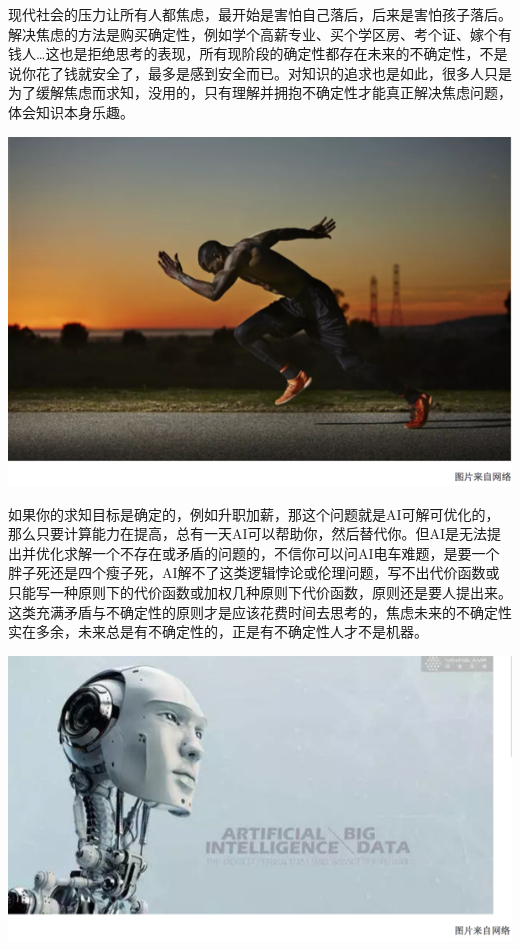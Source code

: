 \documentclass[]{book}
\begin{document}
现代社会的压力让所有人都焦虑，最开始是害怕自己落后，后来是害怕孩子落后。解决焦虑的方法是购买确定性，例如学个高薪专业、买个学区房、考个证、嫁个有钱人\ldots{}这也是拒绝思考的表现，所有现阶段的确定性都存在未来的不确定性，不是说你花了钱就安全了，最多是感到安全而已。对知识的追求也是如此，很多人只是为了缓解焦虑而求知，没用的，只有理解并拥抱不确定性才能真正解决焦虑问题，体会知识本身乐趣。

\includegraphics[width=8.33in]{images/gtd4}

如果你的求知目标是确定的，例如升职加薪，那这个问题就是AI可解可优化的，那么只要计算能力在提高，总有一天AI可以帮助你，然后替代你。但AI是无法提出并优化求解一个不存在或矛盾的问题的，不信你可以问AI电车难题，是要一个胖子死还是四个瘦子死，AI解不了这类逻辑悖论或伦理问题，写不出代价函数或只能写一种原则下的代价函数或加权几种原则下代价函数，原则还是要人提出来。这类充满矛盾与不确定性的原则才是应该花费时间去思考的，焦虑未来的不确定性实在多余，未来总是有不确定性的，正是有不确定性人才不是机器。

\includegraphics[width=8.33in]{images/gtd5}
\end{document}
